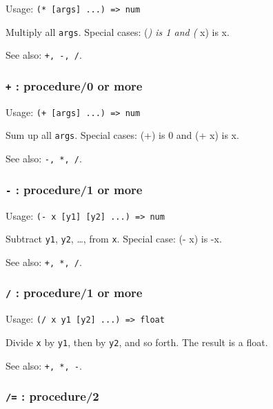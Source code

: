 \documentclass[
]{article}
\newcommand{\passthrough}[1]{#1}
\begin{document}
Usage: \passthrough{\lstinline!(* [args] ...) => num!}

Multiply all \passthrough{\lstinline!args!}. Special cases: (\emph{) is
1 and (} x) is x.

See also: \passthrough{\lstinline!+, -, /!}.

\hypertarget{procedure0-or-more-1}{%
\subsubsection{\texorpdfstring{\texttt{+} : procedure/0 or
more}{+ : procedure/0 or more}}\label{procedure0-or-more-1}}

Usage: \passthrough{\lstinline!(+ [args] ...) => num!}

Sum up all \passthrough{\lstinline!args!}. Special cases: (+) is 0 and
(+ x) is x.

See also: \passthrough{\lstinline!-, *, /!}.

\hypertarget{procedure1-or-more}{%
\subsubsection{\texorpdfstring{\texttt{-} : procedure/1 or
more}{- : procedure/1 or more}}\label{procedure1-or-more}}

Usage: \passthrough{\lstinline!(- x [y1] [y2] ...) => num!}

Subtract \passthrough{\lstinline!y1!}, \passthrough{\lstinline!y2!},
\ldots, from \passthrough{\lstinline!x!}. Special case: (- x) is -x.

See also: \passthrough{\lstinline!+, *, /!}.

\hypertarget{procedure1-or-more-1}{%
\subsubsection{\texorpdfstring{\texttt{/} : procedure/1 or
more}{/ : procedure/1 or more}}\label{procedure1-or-more-1}}

Usage: \passthrough{\lstinline!(/ x y1 [y2] ...) => float!}

Divide \passthrough{\lstinline!x!} by \passthrough{\lstinline!y1!}, then
by \passthrough{\lstinline!y2!}, and so forth. The result is a float.

See also: \passthrough{\lstinline!+, *, -!}.

\hypertarget{procedure2-1}{%
\subsubsection{\texorpdfstring{\texttt{/=} :
procedure/2}{/= : procedure/2}}\label{procedure2-1}}
\end{document}

